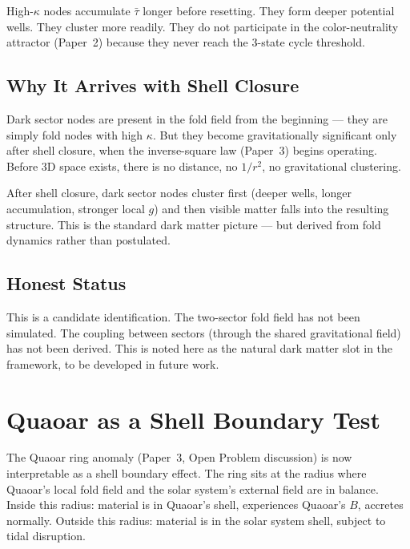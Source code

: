 \documentclass[12pt]{article}
\newcommand{\taubar}{\bar{\tau}}
\begin{document}
High-$\kappa$ nodes accumulate $\taubar$ longer before resetting.
They form deeper potential wells. They cluster more readily.
They do not participate in the color-neutrality attractor (Paper~2)
because they never reach the 3-state cycle threshold.

\subsection{Why It Arrives with Shell Closure}

Dark sector nodes are present in the fold field from the beginning ---
they are simply fold nodes with high $\kappa$. But they become
gravitationally significant only after shell closure, when the
inverse-square law (Paper~3) begins operating. Before 3D space exists,
there is no distance, no $1/r^2$, no gravitational clustering.

After shell closure, dark sector nodes cluster first (deeper wells,
longer accumulation, stronger local $g$) and then visible matter
falls into the resulting structure. This is the standard dark matter
picture --- but derived from fold dynamics rather than postulated.

\subsection{Honest Status}

This is a candidate identification. The two-sector fold field has not
been simulated. The coupling between sectors (through the shared
gravitational field) has not been derived. This is noted here as
the natural dark matter slot in the framework, to be developed in
future work.

\section{Quaoar as a Shell Boundary Test}

The Quaoar ring anomaly (Paper~3, Open Problem discussion) is now
interpretable as a shell boundary effect. The ring sits at the radius
where Quaoar's local fold field and the solar system's external field
are in balance. Inside this radius: material is in Quaoar's shell,
experiences Quaoar's $B$, accretes normally. Outside this radius:
material is in the solar system shell, subject to tidal disruption.
\end{document}
